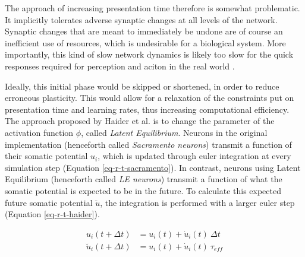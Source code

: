 The approach of increasing presentation time therefore is somewhat problematic. It implicitly tolerates adverse synaptic
changes at all levels of the network. Synaptic changes that are meant to immediately be undone  are of course an
inefficient use of resources, which is undesirable for a biological system. More importantly, this kind of slow network
dynamics is likely too slow for the quick responses required for perception and aciton in the real world
\citep{Bartunov2018}.\newline

Ideally, this initial phase would be skipped or shortened, in order to reduce erroneous plasticity. This would allow for
a relaxation of the constraints put on presentation time and learning rates, thus increasing computational efficiency.
The approach proposed by Haider et al. is to change the parameter of the activation function $\phi$, called
\textit{Latent Equilibrium}. Neurons in the original implementation (henceforth called \textit{Sacramento neurons})
transmit a function of their somatic potential $u_i$, which is updated through euler integration at every simulation
step (Equation \ref{eq-r-t-sacramento}). In contrast, neurons using Latent Equilibrium (henceforth called \textit{LE
  neurons}) transmit a function of what the somatic potential is expected to be in the future. To calculate this expected
future somatic potential $\breve{u}$, the integration is performed with a larger euler step (Equation
\ref{eq-r-t-haider}).

\begin{align}
  u_i(t+ \Delta t)          & = u_i(t) + \dot{u}_i(t) \ \Delta t \label{eq-r-t-sacramento} \\
  \breve{u}_i(t + \Delta t) & = u_i(t) + \dot{u}_i(t) \ \tau_{eff} \label{eq-r-t-haider}
\end{align}

